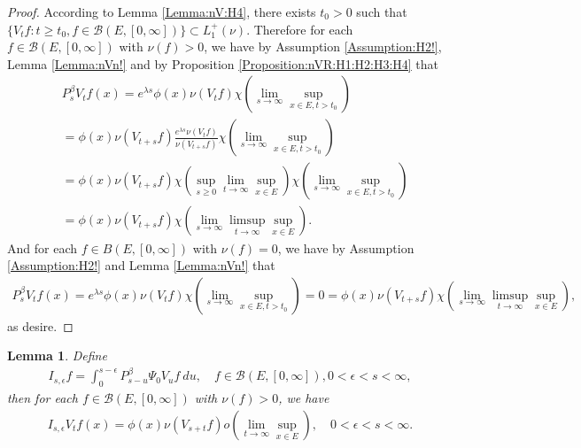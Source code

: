 \documentclass[12pt,a4paper]{amsart}
\numberwithin{equation}{section}
\theoremstyle{plain}
\newtheorem{lem}[thm]{Lemma}
\theoremstyle{definition}
\theoremstyle{remark}
\begin{document}
\begin{proof}
According to Lemma \ref{Lemma:nV:H4}, there exists $t_0 > 0$ such that $\{V_tf: t\geq t_0, f\in \mathcal B(E,[0,\infty])\} \subset L_1^+(\nu)$.
Therefore for each $f\in \mathcal B(E,[0,\infty])$ with $\nu(f)>0$, we have  by Assumption \ref{Assumption:H2!}, Lemma \ref{Lemma:nVn!} and by Proposition \ref{Proposition:nVR:H1:H2:H3:H4} that 
\begin{align}
&P_s^\beta V_t f(x) 
= e^{\lambda s} \phi(x) \nu(V_tf) \chi(\lim_{s\to \infty} \sup_{x\in E, t > t_0})
\\&=\phi(x) \nu(V_{t+s}f)  \frac{e^{\lambda s} \nu(V_tf)}{ \nu(V_{t+s}f)} \chi(\lim_{s\to \infty}\sup_{x\in E, t> t_0})
\\&= \phi(x) \nu(V_{t+s}f) \chi(\sup_{s\geq 0}\lim_{t\to \infty}\sup_{x\in E}) \chi(\lim_{s\to \infty} \sup_{x\in E, t> t_0}) 
\\&= \phi(x)\nu(V_{t+s}f)\chi(\lim_{s\to \infty} \limsup_{t\to \infty} \sup_{x\in E}).
\end{align}
And for each $f\in B(E,[0,\infty])$ with $\nu(f)= 0$, we have by Assumption \ref{Assumption:H2!} and Lemma \ref{Lemma:nVn!} that
\begin{align}
 P_s^\beta V_t f(x) 
 = e^{\lambda s} \phi(x) \nu(V_tf) \chi(\lim_{s\to \infty} \sup_{x\in E, t > t_0})
= 0
 = \phi(x)\nu(V_{t+s}f)\chi(\lim_{s\to \infty} \limsup_{t\to \infty} \sup_{x\in E}),
 \end{align} 
as desire.
\end{proof}
\begin{lem} \label{Lemma:IVf:H1:H2:H3:H4} 
Define 
\begin{align} 
 I_{s,\epsilon} f 
 = \int_0^{s - \epsilon} P_{s - u}^\beta \Psi_0 V_u f ~du,
 \quad f\in \mathcal B(E,[0,\infty]), 0 < \epsilon < s < \infty,
 \end{align} 
then for each $f\in \mathcal B(E,[0,\infty])$ with $\nu(f)>0$, we have
\begin{align}
 I_{s,\epsilon}V_t f(x) 
 = \phi(x) \nu(V_{s+t} f) o(\lim_{t\to \infty} \sup_{x\in E}),
 \quad 0 < \epsilon < s< \infty.
 \end{align}
\end{lem}
\end{document}
